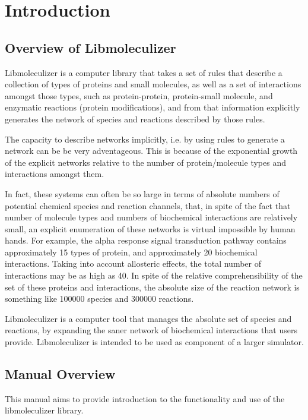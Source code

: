 \chapter{Introduction}

\section{Overview of Libmoleculizer}
Libmoleculizer is a computer library that takes a set of rules that
describe a collection of types of proteins and small molecules, as
well as a set of interactions amongst those types, such as
protein-protein, protein-small molecule, and enzymatic reactions
(protein modifications), and from that information explicitly
generates the network of species and reactions described by those
rules.  

The capacity to describe networks implicitly, i.e. by using rules to
generate a network can be be very adventageous.  This is because of
the exponential growth of the explicit networks relative to the number
of protein/molecule types and interactions amongst them.  


In fact, these systems can often be so large in terms of absolute
numbers of potential chemical species and reaction channels, that, in
spite of the fact that number of molecule types and numbers of
biochemical interactions are relatively small, an explicit enumeration
of these networks is virtual impossible by human hands.  For example,
the alpha response signal transduction pathway contains approximately
15 types of protein, and approximately 20 biochemical interactions.
Taking into account allosteric effects, the total number of
interactions may be as high as 40.  In spite of the relative
comprehensibility of the set of these proteins and interactions, the
absolute size of the reaction network is something like 100000 species
and 300000 reactions.  

Libmoleculizer is a computer tool that manages the absolute set of
species and reactions, by expanding the saner network of biochemical
interactions that users provide.  Libmoleculizer is intended to be
used as component of a larger simulator.


\section{Manual Overview}
This manual aims to provide introduction to the functionality and use
of the libmoleculizer library.  

